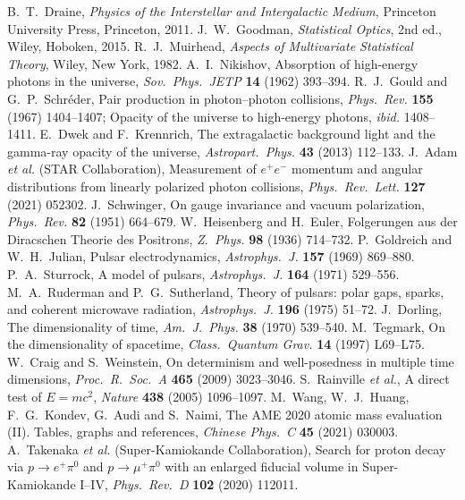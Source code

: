  B.~T.~Draine, \emph{Physics of the Interstellar and Intergalactic Medium}, Princeton University Press, Princeton, 2011.
 J.~W.~Goodman, \emph{Statistical Optics}, 2nd ed., Wiley, Hoboken, 2015.
 R.~J.~Muirhead, \emph{Aspects of Multivariate Statistical Theory}, Wiley, New York, 1982.
 A.~I.~Nikishov, Absorption of high-energy photons in the universe, \emph{Sov.\ Phys.\ JETP} \textbf{14} (1962) 393--394.
 R.~J.~Gould and G.~P.~Schr\'eder, Pair production in photon--photon collisions, \emph{Phys.\ Rev.} \textbf{155} (1967) 1404--1407; Opacity of the universe to high-energy photons, \emph{ibid.} 1408--1411.
 E.~Dwek and F.~Krennrich, The extragalactic background light and the gamma-ray opacity of the universe, \emph{Astropart.\ Phys.} \textbf{43} (2013) 112--133.
 J.~Adam \emph{et al.} (STAR Collaboration), Measurement of $e^+e^-$ momentum and angular distributions from linearly polarized photon collisions, \emph{Phys.\ Rev.\ Lett.} \textbf{127} (2021) 052302.
 J.~Schwinger, On gauge invariance and vacuum polarization, \emph{Phys.\ Rev.} \textbf{82} (1951) 664--679.
 W.~Heisenberg and H.~Euler, Folgerungen aus der Diracschen Theorie des Positrons, \emph{Z.\ Phys.} \textbf{98} (1936) 714--732.
 P.~Goldreich and W.~H.~Julian, Pulsar electrodynamics, \emph{Astrophys.\ J.} \textbf{157} (1969) 869--880.
 P.~A.~Sturrock, A model of pulsars, \emph{Astrophys.\ J.} \textbf{164} (1971) 529--556.
 M.~A.~Ruderman and P.~G.~Sutherland, Theory of pulsars: polar gaps, sparks, and coherent microwave radiation, \emph{Astrophys.\ J.} \textbf{196} (1975) 51--72.
 J.~Dorling, The dimensionality of time, \emph{Am.\ J.\ Phys.} \textbf{38} (1970) 539--540.
 M.~Tegmark, On the dimensionality of spacetime, \emph{Class.\ Quantum Grav.} \textbf{14} (1997) L69--L75.
 W.~Craig and S.~Weinstein, On determinism and well-posedness in multiple time dimensions, \emph{Proc.\ R.\ Soc.\ A} \textbf{465} (2009) 3023--3046.
 S.~Rainville \emph{et al.}, A direct test of $E=mc^2$, \emph{Nature} \textbf{438} (2005) 1096--1097.
 M.~Wang, W.~J.~Huang, F.~G.~Kondev, G.~Audi and S.~Naimi, The AME 2020 atomic mass evaluation (II). Tables, graphs and references, \emph{Chinese Phys.\ C} \textbf{45} (2021) 030003.
 A.~Takenaka \emph{et al.} (Super-Kamiokande Collaboration), Search for proton decay via $p\to e^+\pi^0$ and $p\to\mu^+\pi^0$ with an enlarged fiducial volume in Super-Kamiokande I--IV, \emph{Phys.\ Rev.\ D} \textbf{102} (2020) 112011.
